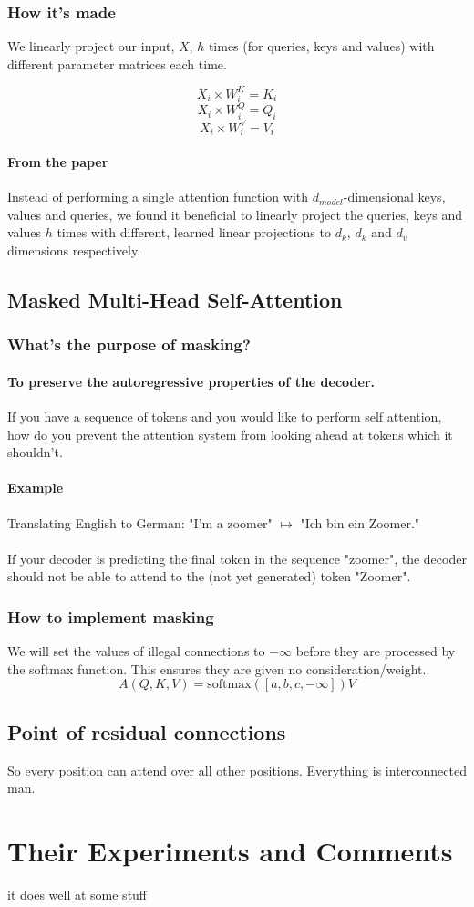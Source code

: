 \documentclass{article}
\begin{document}
    \subsubsection{How it's made}
    We linearly project our input, $X$, $h$ times (for queries, keys and values) with different parameter matrices each time.

    \[ X_i \times W_i^K = K_i\]
    \[ X_i \times W_i^Q = Q_i \]
    \[ X_i \times W_i^V = V_i \]

    \paragraph{From the paper} Instead of performing a single attention function with
    \linebreak
    $d_{model}$-dimensional keys, values and queries, we found it beneficial to linearly project the queries, keys and values $h$ times with different, learned linear projections to $d_k$, $d_k$ and $d_v$ dimensions respectively.

    \subsection{Masked Multi-Head Self-Attention}
    \subsubsection{What's the purpose of masking?}
    \paragraph{To preserve the autoregressive properties of the decoder.}
    If you have a sequence of tokens and you would like to perform self attention, how do you prevent the attention system from looking ahead at tokens which it shouldn't.
    \paragraph{Example} Translating English to German: 
    "I'm a zoomer" $\mapsto$ "Ich bin ein Zoomer."
    \paragraph{} If your decoder is predicting the final token in the sequence "zoomer", the decoder should not be able to attend to the (not yet generated) token "Zoomer". 

    \subsubsection{How to implement masking}
    We will set the values of illegal connections to $-\infty$ before they are processed by the softmax function. This ensures they are given no consideration/weight.
    \[ A(Q,K,V) = \text{softmax} \left ([a, b, c, -\infty] \right) V \] 
    
    \subsection{Point of residual connections}
    So every position can attend over all other positions. Everything is interconnected man.

    \section{Their Experiments and Comments}
    it does well at some stuff
\end{document}
